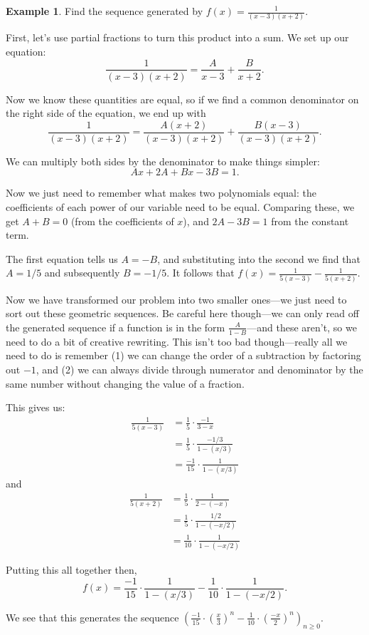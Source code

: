 \documentclass{article}
\theoremstyle{definition}
\newtheorem{example}{Example}
\begin{document}
\begin{example}
Find the sequence generated by $f(x)=\frac{1}{(x-3)(x+2)}$.

First, let's use partial fractions to turn this product into a sum. We set up our equation:
\[\frac{1}{(x-3)(x+2)}=\frac{A}{x-3}+\frac{B}{x+2}.\]

Now we know these quantities are equal, so if we find a common denominator on the right side of the equation, we end up with
\[\frac{1}{(x-3)(x+2)}=\frac{A(x+2)}{(x-3)(x+2)}+\frac{B(x-3)}{(x-3)(x+2)}.\]

We can multiply both sides by the denominator to make things simpler:
\[A x+2 A+B x-3 B=1.\]

Now we just need to remember what makes two polynomials equal: the coefficients of each power of our variable need to be equal. Comparing these, we get $A+B=0$ (from the coefficients of $x$), and $2 A-3 B=1$ from the constant term.

The first equation tells us $A=-B$, and substituting into the second we find that $A=1/5$ and subsequently $B=-1/5$. It follows that $f(x)=\frac{1}{5(x-3)}-\frac{1}{5(x+2)}$.

Now we have transformed our problem into two smaller ones---we just need to sort out these geometric sequences. Be careful here though---we can only read off the generated sequence if a function is in the form $\frac{A}{1-B}$---and these aren't, so we need to do a bit of creative rewriting. This isn't too bad though---really all we need to do is remember (1) we can change the order of a subtraction by factoring out $-1$, and (2) we can always divide through numerator and denominator by the same number without changing the value of a fraction.

This gives us:
\begin{align}
\frac{1}{5(x-3)} &= \frac{1}{5} \cdot \frac{-1}{3-x} \\
&= \frac{1}{5} \cdot \frac{-1/3}{1-(x/3)} \\
&= \frac{-1}{15} \cdot \frac{1}{1-(x/3)}
\end{align}
and
\begin{align}
\frac{1}{5(x+2)} &= \frac{1}{5} \cdot \frac{1}{2-(-x)} \\
&= \frac{1}{5} \cdot \frac{1/2}{1-(-x/2)} \\
&= \frac{1}{10} \cdot \frac{1}{1-(-x/2)}
\end{align}

Putting this all together then,
\[f(x)=\frac{-1}{15} \cdot \frac{1}{1-(x/3)}-\frac{1}{10} \cdot \frac{1}{1-(-x/2)}.\]

We see that this generates the sequence $\left(\frac{-1}{15} \cdot\left(\frac{x}{3}\right)^{n}-\frac{1}{10} \cdot\left(\frac{-x}{2}\right)^{n}\right)_{n \geq 0}$.
\end{example}
\end{document}
